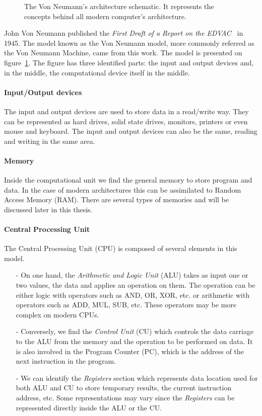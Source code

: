 \begin{figure}
\centering 

\caption[Von Neumann's architecture]{The Von Neumann's architecture schematic. It represents the concepts behind all modern computer's architecture. }
\label{fig:1_HPC:von_neumann_model}
\end{figure}

John Von Neumann published the \textit{First Draft of a Report on the EDVAC}~\cite{von1993first} in 1945. 
The model known as the Von Neumann model, more commonly referred as the Von Neumann Machine, came from this work.
The model is presented on figure~\ref{fig:1_HPC:von_neumann_model}.
The figure has three identified parts: the input and output devices and, in the middle, the computational device itself in the middle. 
\paragraph{Input/Output devices}
The input and output devices are used to store data in a read/write way. 
They can be represented as hard drives, solid state drives, monitors, printers or even mouse and keyboard.
The input and output devices can also be the same, reading and writing in the same area.\\

\paragraph{Memory} 
Inside the computational unit we find the general memory to store program and data. 
In the case of modern architectures this can be assimilated to Random Access Memory (RAM). 
There are several types of memories and will be discussed later in this thesis. 

\paragraph{Central Processing Unit}
The Central Processing Unit (CPU) is composed of several elements in this model. 
\begin{itemize}[noitemsep,nolistsep]
\item[-] On one hand, the \textit{Arithmetic and Logic Unit} (ALU) takes as input one or two values, the data and applies an operation on them. 
The operation can be either logic with operators such as AND, OR, XOR, etc. or arithmetic with operators such as ADD, MUL, SUB, etc. 
These operators may be more complex on modern CPUs. 
\item[-] Conversely, we find the \textit{Control Unit} (CU) which controls the data carriage to the ALU from the memory and the operation to be performed on data.
It is also involved in the Program Counter (PC), which is the address of the next instruction in the program. 
\item[-] We can identify the \textit{Registers} section which represents data location used for both ALU and CU to store temporary results, the current instruction address, etc. 
Some representations may vary since the \textit{Registers} can be represented directly inside the ALU or the CU. 
\end{itemize}

